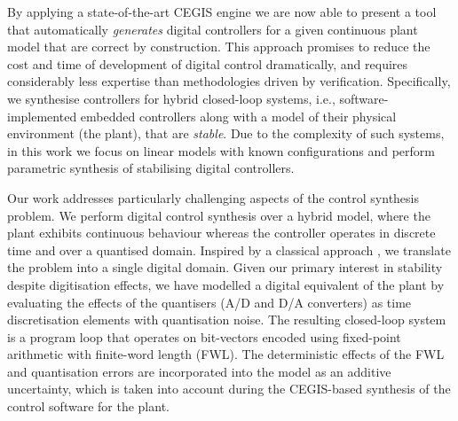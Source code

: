 \documentclass{sig-alternate-05-2015}
\begin{document}
By applying a state-of-the-art CEGIS engine we are now able to present a
tool that automatically \emph{generates} digital controllers for a given
continuous plant model that are correct by construction.  This approach promises to
reduce the cost and time of development of digital control dramatically, and
requires considerably less expertise than methodologies driven by
verification.  Specifically, we synthesise controllers for hybrid
closed-loop systems, i.e., software-implemented embedded controllers along
with a model of their physical environment (the plant), that are
\emph{stable}.  Due to the complexity of such systems, in this work we focus on linear
models with known configurations and perform parametric synthesis of stabilising digital controllers.

Our work addresses particularly challenging aspects of the control synthesis
problem.  We perform digital control synthesis over a hybrid model, where
the plant exhibits continuous behaviour whereas the controller operates in 
discrete time and over a quantised domain.  
Inspired by a classical approach \cite{astrom1997computer}, 
we translate the problem into a single digital domain.  
Given our primary interest in stability despite digitisation effects, we have modelled
a digital equivalent of the plant by evaluating the effects of the
quantisers (A/D and D/A converters) as time discretisation elements with
quantisation noise.  The resulting closed-loop system is a program loop that
operates on bit-vectors encoded using fixed-point arithmetic with finite-word
length (FWL). The deterministic effects of the FWL and
quantisation errors are incorporated into the model as an additive
uncertainty, which is taken into account during the CEGIS-based synthesis of
the control software for the plant.
\end{document}
